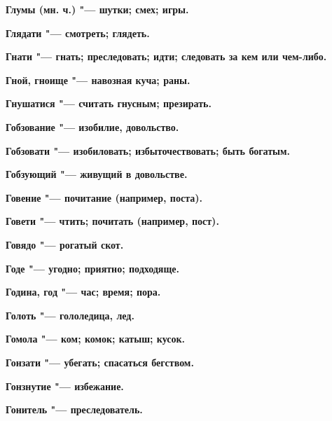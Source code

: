 \bfseries Глумы \normalfont{} (мн. ч.) "--- шутки; смех; игры. 




\bfseries Глядати \normalfont{} "--- смотреть; глядеть. 




\bfseries Гнати \normalfont{} "--- гнать; преследовать; идти; следовать за кем или чем-либо. 




\bfseries Гной, гноище \normalfont{} "--- навозная куча; раны. 




\bfseries Гнушатися \normalfont{} "--- считать гнусным; презирать. 




\bfseries Гобзование \normalfont{} "--- изобилие, довольство. 




\bfseries Гобзовати \normalfont{} "--- изобиловать; избыточествовать; быть богатым. 




\bfseries Гобзующий \normalfont{} "--- живущий в довольстве. 




\bfseries Говение \normalfont{} "--- почитание (например, поста). 




\bfseries Говети \normalfont{} "--- чтить; почитать (например, пост). 




\bfseries Говядо \normalfont{} "--- рогатый скот. 




\bfseries Годе \normalfont{} "--- угодно; приятно; подходяще. 




\bfseries Година, год \normalfont{} "--- час; время; пора. 




\bfseries Голоть \normalfont{} "--- гололедица, лед. 




\bfseries Гомола \normalfont{} "--- ком; комок; катыш; кусок. 




\bfseries Гонзати \normalfont{} "--- убегать; спасаться бегством. 




\bfseries Гонзнутие \normalfont{} "--- избежание. 




\bfseries Гонитель \normalfont{} "--- преследователь. 




